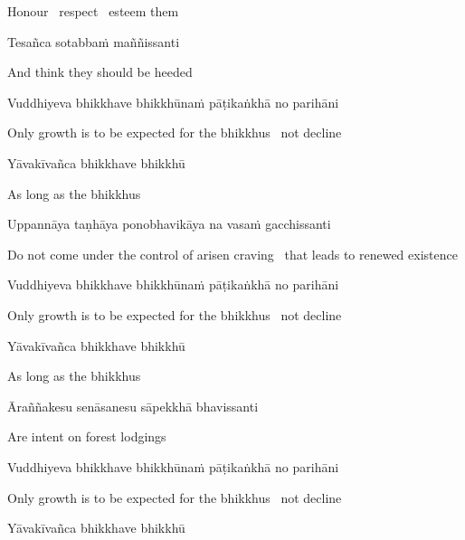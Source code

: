 \begin{cprenglish}
  Honour \breathmark\ respect \breathmark\ esteem them
\end{cprenglish}

Tesañca sotabbaṁ maññissanti

\begin{cprenglish}
  And think they should be heeded
\end{cprenglish}

Vuddhiyeva bhikkhave bhikkhūnaṁ pāṭikaṅkhā no parihāni

\begin{cprenglish}
  Only growth is to be expected for the bhikkhus \breathmark\ not decline
\end{cprenglish}

Yāvakīvañca bhikkhave bhikkhū

\begin{cprenglish}
  As long as the bhikkhus
\end{cprenglish}

Uppannāya taṇhāya ponobhavikāya na vasaṁ gacchissanti

\begin{cprenglish}
  Do not come under the control of arisen craving \breathmark\ that leads to renewed existence
\end{cprenglish}

Vuddhiyeva bhikkhave bhikkhūnaṁ pāṭikaṅkhā no parihāni

\begin{cprenglish}
  Only growth is to be expected for the bhikkhus \breathmark\ not decline
\end{cprenglish}

Yāvakīvañca bhikkhave bhikkhū

\begin{cprenglish}
  As long as the bhikkhus
\end{cprenglish}

Āraññakesu senāsanesu sāpekkhā bhavissanti

\begin{cprenglish}
  Are intent on forest lodgings
\end{cprenglish}

Vuddhiyeva bhikkhave bhikkhūnaṁ pāṭikaṅkhā no parihāni

\begin{cprenglish}
  Only growth is to be expected for the bhikkhus \breathmark\ not decline
\end{cprenglish}

Yāvakīvañca bhikkhave bhikkhū

